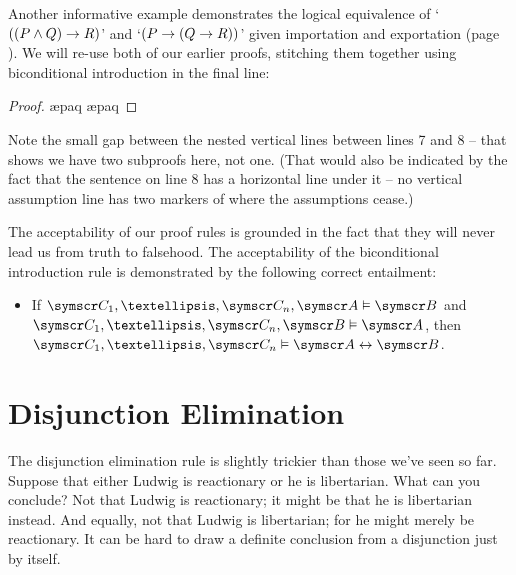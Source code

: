 Another informative example demonstrates the logical equivalence of `$((P \wedge Q) \rightarrow R)$' and `$(P \rightarrow (Q \rightarrow R))$' given importation and exportation (page \pageref{import.export}). We will re-use both of our earlier proofs, stitching them together using biconditional introduction in the final line: \begin{proof}
\open	{}
	\open
	\ae{paq}
	\ae{paq}
	\close
\close
\open
	\open
	\open
	\close
	\close
	\close
\end{proof}
Note the small gap between the nested vertical lines between lines 7 and 8 – that shows we have two subproofs here, not one. (That would also be indicated by the fact that the sentence on line 8 has a horizontal line under it – no vertical assumption line has two markers of where the assumptions cease.)



The acceptability of our proof rules is grounded in the fact that they will never lead us from truth to falsehood. The acceptability of the biconditional introduction rule is demonstrated by the following correct entailment: \begin{itemize}
	\item If $\meta{C}_{1},…,\meta{C}_{n},\meta{A}\vDash\meta{B}$ and $\meta{C}_{1},…,\meta{C}_{n},\meta{B}\vDash\meta{A}$, then $\meta{C}_{1},…,\meta{C}_{n}\vDash\meta{A}\eiff\meta{B}$.
\end{itemize}



\section{Disjunction Elimination}\label{disjelim}


The disjunction elimination rule is slightly trickier than those we've seen so far. Suppose that either Ludwig is reactionary or he is libertarian. What can you conclude? Not that Ludwig is reactionary; it might be that he is libertarian instead. And equally, not that Ludwig is libertarian; for he might merely be reactionary. It can be hard to draw a definite conclusion from a disjunction just by itself.

